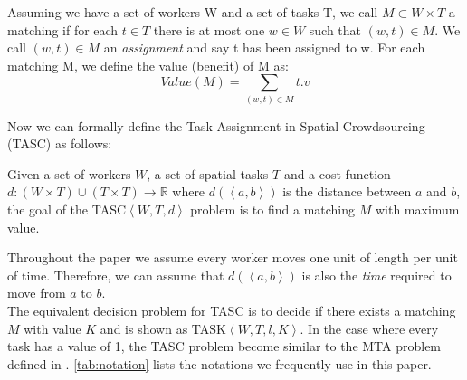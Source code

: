 \begin{definition} [Matching]
Assuming we have a set of workers W and a set of tasks T, we call $M \subset W \times T$ a matching if for each $t \in T$ there is at most one $w \in W$ such that $\left( w, t \right) \in M$. We call $\left( w, t \right) \in M$ an \emph{assignment} and say t has been assigned to w. For each matching M, we define the value (benefit) of M as:
\begin{equation*}
Value(M) = \sum_{\left( w, t \right) \in M} t.v
\end{equation*}
\end{definition}

Now we can formally define the Task Assignment in Spatial Crowdsourcing (TASC) as follows:

\begin{definition}
Given a set of workers $W$, a set of spatial tasks $T$ and a cost function $d: \left( W \times T \right) \cup \left( T \times T \right) \rightarrow \mathbb{R}$ where $d \left( \left\langle a,b \right\rangle \right)$ is the distance between $a$ and $b$, the goal of the TASC$\left\langle W, T, d \right\rangle$ problem is to find a matching $M$ with maximum value.
\end{definition}
Throughout the paper we assume every worker moves one unit of length per unit of time. Therefore, we can assume that $d \left( \left\langle a,b \right\rangle \right)$ is also the \emph{time} required to move from $a$ to $b$.\\

The equivalent decision problem for TASC is to decide if there exists a matching $M$ with value $K$ and is shown as TASK$\left\langle W, T, l, K \right\rangle$. In the case where every task has a value of 1, the TASC problem become similar to the MTA problem defined in \cite{kazemi12}. \cref{tab:notation} lists the notations we frequently use in this paper.\\

